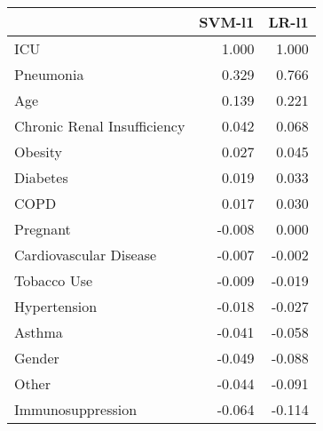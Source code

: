 \begin{tabular}{lrr}
\toprule
{} &  SVM-l1 &  LR-l1 \\
\midrule
ICU                         &   1.000 &  1.000 \\
Pneumonia                   &   0.329 &  0.766 \\
Age                         &   0.139 &  0.221 \\
Chronic Renal Insufficiency &   0.042 &  0.068 \\
Obesity                     &   0.027 &  0.045 \\
Diabetes                    &   0.019 &  0.033 \\
COPD                        &   0.017 &  0.030 \\
Pregnant                    &  -0.008 &  0.000 \\
Cardiovascular Disease      &  -0.007 & -0.002 \\
Tobacco Use                 &  -0.009 & -0.019 \\
Hypertension                &  -0.018 & -0.027 \\
Asthma                      &  -0.041 & -0.058 \\
Gender                      &  -0.049 & -0.088 \\
Other                       &  -0.044 & -0.091 \\
Immunosuppression           &  -0.064 & -0.114 \\
\bottomrule
\end{tabular}
